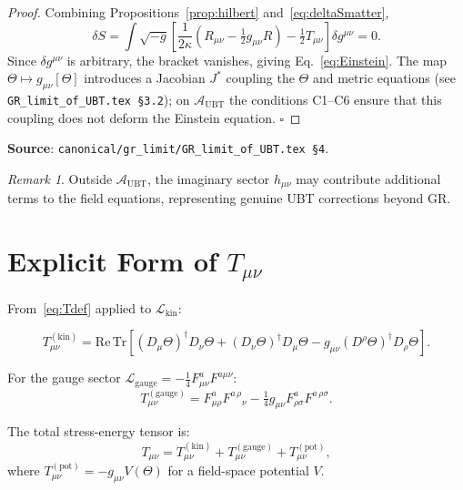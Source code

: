 \documentclass[11pt,a4paper]{article}
\theoremstyle{definition}
\theoremstyle{remark}
\newtheorem{remark}[theorem]{Remark}
\begin{document}
\begin{proof}
Combining Propositions~\ref{prop:hilbert} and~\eqref{eq:deltaSmatter},
\begin{equation}
  \delta S = \int\sqrt{-g}\!\left[\frac{1}{2\kappa}\!\left(R_{\mu\nu}
  - \tfrac12 g_{\mu\nu}R\right) - \tfrac12 T_{\mu\nu}\right]\delta g^{\mu\nu}
  = 0.
\end{equation}
Since $\delta g^{\mu\nu}$ is arbitrary, the bracket vanishes, giving
Eq.~\eqref{eq:Einstein}.  The map $\Theta \mapsto g_{\mu\nu}[\Theta]$
introduces a Jacobian $J^*$ coupling the $\Theta$ and metric equations
(see \texttt{GR\_limit\_of\_UBT.tex \S3.2}); on $\mathcal{A}_{\mathrm{UBT}}$
the conditions C1--C6 ensure that this coupling does not deform the
Einstein equation. $\square$
\end{proof}

\noindent\textbf{Source}: \texttt{canonical/gr\_limit/GR\_limit\_of\_UBT.tex \S4}.

\begin{remark}
Outside $\mathcal{A}_{\mathrm{UBT}}$, the imaginary sector $h_{\mu\nu}$ may
contribute additional terms to the field equations, representing genuine UBT
corrections beyond GR.
\end{remark}

\section{Explicit Form of $T_{\mu\nu}$}\label{sec:tmunu}

From~\eqref{eq:Tdef} applied to $\mathcal{L}_{\mathrm{kin}}$:

\begin{equation}\label{eq:Tkin}
  T^{(\mathrm{kin})}_{\mu\nu}
  = \mathrm{Re}\,\mathrm{Tr}\!\left[
    (D_\mu\Theta)^\dagger D_\nu\Theta
    + (D_\nu\Theta)^\dagger D_\mu\Theta
    - g_{\mu\nu}(D^\rho\Theta)^\dagger D_\rho\Theta
  \right].
\end{equation}

For the gauge sector $\mathcal{L}_{\mathrm{gauge}} = -\frac14 F^a_{\mu\nu}F^{a\mu\nu}$:
\begin{equation}\label{eq:Tgauge}
  T^{(\mathrm{gauge})}_{\mu\nu}
  = F^a_{\mu\rho}F^{a\,\rho}{}_\nu
  - \tfrac{1}{4}g_{\mu\nu}F^a_{\rho\sigma}F^{a\,\rho\sigma}.
\end{equation}

The total stress-energy tensor is:
\begin{equation}\label{eq:Ttotal}
  T_{\mu\nu} = T^{(\mathrm{kin})}_{\mu\nu} + T^{(\mathrm{gauge})}_{\mu\nu}
  + T^{(\mathrm{pot})}_{\mu\nu},
\end{equation}
where $T^{(\mathrm{pot})}_{\mu\nu} = -g_{\mu\nu}V(\Theta)$ for a
field-space potential $V$.
\end{document}
